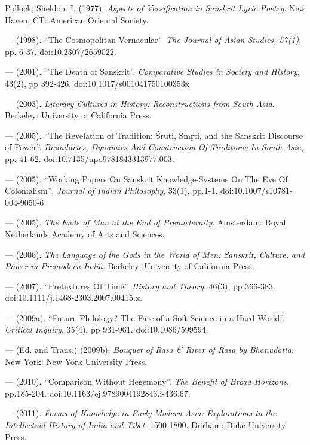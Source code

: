 \begin{thebibliography}{99}
  Pollock, Sheldon. I. (1977). \textit{Aspects of Versification in Sanskrit Lyric Poetry}. New Haven, CT: American Oriental Society.

  — (1998). “The Cosmopolitan Vernacular”. \textit{The Journal of Asian Studies, 57(1)}, pp. 6-37. doi:10.2307/2659022.

  — (2001). “The Death of Sanskrit”. \textit{Comparative Studies in Society and History}, 43(2), pp 392-426. doi:10.1017/s001041750100353x

  — (2003). \textit{Literary Cultures in History: Reconstructions from South Asia}. Berkeley: University of California Press.

  — (2005). “The Revelation of Tradition: Śruti, Smṛti, and the Sanskrit Discourse of Power”. \textit{Boundaries, Dynamics And Construction Of Traditions In South Asia}, pp. 41-62. doi:10.7135/upo9781843313977.003.

  — (2005). “Working Papers On Sanskrit Knowledge-Systems On The Eve Of Colonialism”, \textit{Journal of Indian Philosophy}, 33(1), pp.1-1. doi:10.1007/s10781-004-9050-6

  — (2005). \textit{The Ends of Man at the End of Premodernity}. Amsterdam: Royal Netherlands Academy of Arts and Sciences.

  — (2006). \textit{The Language of the Gods in the World of Men: Sanskrit, Culture, and Power in Premodern India}. Berkeley: University of California Press.

  — (2007). “Pretextures Of Time”. \textit{History and Theory}, 46(3), pp 366-383. doi:10.1111/j.1468-2303.2007.00415.x.

  — (2009a). “Future Philology? The Fate of a Soft Science in a Hard World”. \textit{Critical Inquiry}, 35(4), pp 931-961. doi:10.1086/599594.

  — (Ed. and Trans.) (2009b). \textit{Bouquet of Rasa \& River of Rasa by Bhanudatta}. New York: New York University Press.

  — (2010). “Comparison Without Hegemony”. \textit{The Benefit of Broad Horizons}, pp.185-204. doi:10.1163/ej.9789004192843.i-436.67.

  — (2011). \textit{Forms of Knowledge in Early Modern Asia: Explorations in the Intellectual History of India and Tibet}, 1500-1800. Durham: Duke University Press.


\end{thebibliography}
